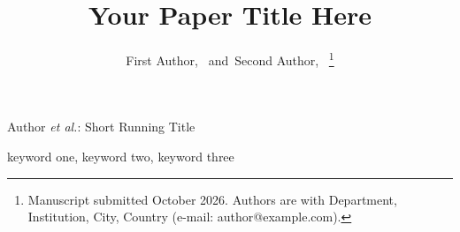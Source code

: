\documentclass[journal]{IEEEtran}
\begin{document}
\title{Your Paper Title Here}

\author{First Author,~
        and~Second Author,~%
\thanks{Manuscript submitted October 2026. Authors are with Department, Institution, City, Country (e-mail: author@example.com).}}

%
{Author \MakeLowercase{\textit{et al.}}: Short Running Title}

\maketitle



\begin{IEEEkeywords}
keyword one, keyword two, keyword three
\end{IEEEkeywords}









\end{document}
